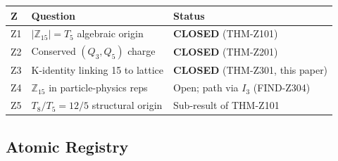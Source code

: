 \documentclass[12pt, a4paper]{article}
\begin{document}
\begin{derivedbox}[title={Z-Programme status after TASK-ZC07}]
{\small
\renewcommand{\arraystretch}{1.30}
\begin{tabular}{p{0.8cm} p{7cm} p{3.5cm}}
\toprule
\textbf{Z} & \textbf{Question} & \textbf{Status} \\
\midrule
Z1 & $|\mathbb{Z}_{15}| = T_5$ algebraic origin &
  \textbf{CLOSED} (THM-Z101) \\
Z2 & Conserved $(Q_3, Q_5)$ charge &
  \textbf{CLOSED} (THM-Z201) \\
Z3 & K-identity linking 15 to lattice &
  \textbf{CLOSED} (THM-Z301, this paper) \\
Z4 & $\mathbb{Z}_{15}$ in particle-physics reps &
  Open; path via $I_3$ (FIND-Z304) \\
Z5 & $T_8/T_5 = 12/5$ structural origin &
  Sub-result of THM-Z101 \\
\bottomrule
\end{tabular}
}
\end{derivedbox}

\subsection{Atomic Registry}
\label{sec:registry}
\end{document}
